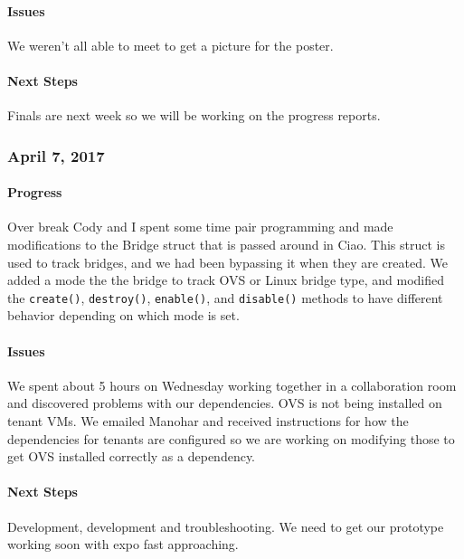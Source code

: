 \documentclass[10pt,onecolumn,journal,draftclsnofoot]{IEEEtran}
\begin{document}
\paragraph{Issues} 

We weren't all able to meet to get a picture for the poster.

\paragraph{Next Steps} 

Finals are next week so we will be working on the progress reports.

\subsubsection{April 7, 2017} 

\paragraph{Progress} 

Over break Cody and I spent some time pair programming and made
modifications to the Bridge struct that is passed around in Ciao. This
struct is used to track bridges, and we had been bypassing it when they
are created. We added a mode the the bridge to track OVS or Linux bridge
type, and modified the \lstinline!create()!, \lstinline!destroy()!,
\lstinline!enable()!, and \lstinline!disable()! methods to have
different behavior depending on which mode is set.

\paragraph{Issues} 

We spent about 5 hours on Wednesday working together in a collaboration
room and discovered problems with our dependencies. OVS is not being
installed on tenant VMs. We emailed Manohar and received instructions
for how the dependencies for tenants are configured so we are working on
modifying those to get OVS installed correctly as a dependency.

\paragraph{Next Steps} 

Development, development and troubleshooting. We need to get our
prototype working soon with expo fast approaching.
\end{document}
